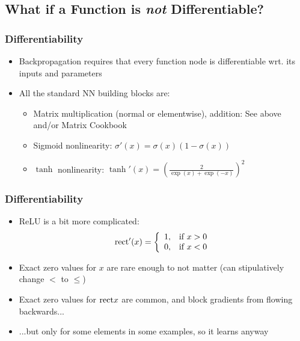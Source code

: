 \documentclass{beamer}
\begin{document}
\subsection{What if a Function is {\em not} Differentiable?}

\begin{frame}
\frametitle{Differentiability}

\begin{itemize}
\item Backpropagation requires that every function node is differentiable wrt. its inputs and parameters
\item All the standard NN building blocks are:
\begin{itemize}
\item Matrix multiplication (normal or elementwise), addition: See above and/or Matrix Cookbook
\item Sigmoid nonlinearity:  $\sigma'(x) = \sigma(x) (1 - \sigma(x))$
\item $\tanh$ nonlinearity:  $\tanh'(x) = \left(\frac{2}{\exp(x)+\exp(-x)}\right)^2$
\end{itemize}
\end{itemize}

\end{frame}

\begin{frame}
\frametitle{Differentiability}

\begin{itemize}
\item ReLU is a bit more complicated:
\begin{align*}
\text{rect}'(x) = \left\{ 
        \begin{array}{l l}
            1, & \text{if }x > 0 \\
            0, & \text{if }x < 0
        \end{array}
        \right.
\end{align*}
\item Exact zero values for $x$ are rare enough to not matter (can stipulatively change $<$ to $\leq$)
\item Exact zero values for $\text{rect}{x}$ are common, and block gradients from flowing backwards...
\item ...but only for some elements in some examples, so it learns anyway
\end{itemize}

\end{frame}
\end{document}
